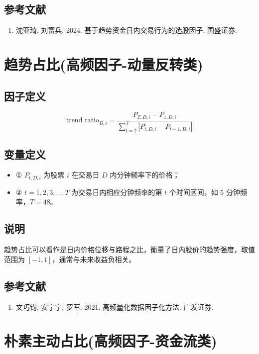 \documentclass{article}
\begin{document}
\subsection{参考文献}
\begin{enumerate}
    \item 沈亚琦, 刘富兵. 2024. 基于趋势资金日内交易行为的选股因子. 国盛证券.
\end{enumerate}

\section{趋势占比(高频因子-动量反转类)}

\subsection{因子定义}
\begin{equation}
    \mathrm{trend\_ratio}_{D,i} = \frac{P_{T,D,i} - P_{1,D,i}}{\sum_{t=2}^{T} |P_{t,D,i} - P_{t-1,D,i}|}
\end{equation}

\subsection{变量定义}
\begin{itemize}
    \item ① \( P_{t,D,i} \) 为股票 \( i \) 在交易日 \( D \) 内分钟频率下的价格；
    \item ② \( t = 1,2,3,\ldots,T \) 为交易日内相应分钟频率的第 \( t \) 个时间区间，如 5 分钟频率，\( T=48 \)。
\end{itemize}

\subsection{说明}
趋势占比可以看作是日内价格位移与路程之比，衡量了日内股价的趋势强度，取值范围为 \([-1, 1]\)，通常与未来收益负相关。

\subsection{参考文献}
\begin{enumerate}
    \item 文巧钧, 安宁宁, 罗军. 2021. 高频量化数据因子化方法. 广发证券.
\end{enumerate}

\section{朴素主动占比(高频因子-资金流类)}
\end{document}
